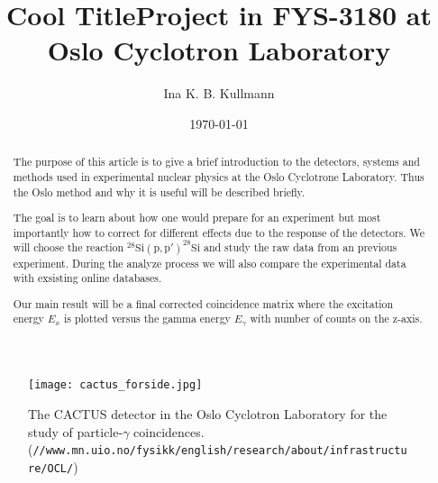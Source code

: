 \documentclass[11pt,a4wide]{article}
\title{{\Huge {\bf Cool Title}}\linebreak \linebreak \small{Project in FYS-3180 at} \linebreak \Large{ Oslo Cyclotron Laboratory}  }
\author{Ina K. B. Kullmann}
\date{\today}
\begin{document}
\maketitle

\begin{abstract}
The purpose of this article is to give a brief introduction to the detectors, systems and methods used in experimental nuclear physics at the Oslo Cyclotrone Laboratory. Thus the Oslo method and why it is useful will be described briefly.

The goal is to learn about how one would prepare for an experiment but most importantly how to correct for different effects due to the response of the detectors. We will choose the reaction ${}^{28}\mathrm{Si(p,p')}^{28}\mathrm{Si}$ and study the raw data from an previous experiment. During the analyze process we will also compare the experimental data with exsisting online databases. 

Our main result will be a final corrected coincidence matrix where the excitation energy $E_x$ is plotted versus the gamma energy $E_\gamma$ with number of counts on the z-axis. 




\end{abstract}

\begin{figure}[htp]
\centering
\texttt{[image: cactus\_forside.jpg]}
\caption{The CACTUS detector in the Oslo Cyclotron Laboratory for the study of particle-$\gamma$ coincidences. (\texttt{//www.mn.uio.no/fysikk/english/research/about/infrastructure/OCL/}) }
\label{fig:front_page}
\end{figure}
\end{document}
